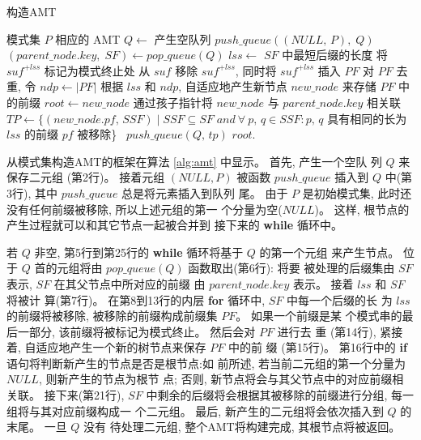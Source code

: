 \begin{algorithm}
  \caption{构造AMT}\scriptsize
  \label{alg:amt}
  \begin{algorithmic}[1]
    \REQUIRE 模式集 $P$
    \ENSURE  相应的 AMT
    \STATE
    \STATE $Q \leftarrow$ 产生空队列
    \STATE $push\_queue((NULL,\,P),\; Q)$
    \STATE
    \STATE $(parent\_node.key,\; SF) \leftarrow pop\_queue(Q)$
    \STATE $lss \leftarrow$ $SF$ 中最短后缀的长度
    \STATE 将 $suf^{+lss}$ 标记为模式终止处
    \ENDIF
    \STATE   从 $suf$ 移除 $suf^{+lss}$, 同时将 $suf^{+lss}$ 插入 $PF$
    \ENDFOR
    \STATE 对 $PF$ 去重, 令 $ndp \leftarrow |PF|$
    \STATE 根据 $lss$ 和 $ndp$, 自适应地产生新节点
    $new\_node$ 来存储 $PF$ 中的前缀
    \STATE $root \leftarrow new\_node$
    \ELSE
    \STATE 通过孩子指针将 $new\_node$
    与 $parent\_node.key$ 相关联
    \ENDIF
    \STATE $TP \leftarrow \{(new\_node.pf,\, SSF) \mid SSF \subseteq SF\; and
    \ \forall \ p,\,q \in SSF: p,\,q$ 具有相同的长为 $lss$ 的前缀
    $pf$ 被移除\}\
    \STATE $push\_queue(Q,\,tp)$
    \ENDFOR
    \ENDWHILE
    \STATE
    \RETURN $root$.
  \end{algorithmic}
\end{algorithm}

从模式集构造AMT的框架在算法 \ref{alg:amt} 中显示。 首先, 产生一个空队
列 $Q$ 来保存二元组 (第2行)。 接着元组 $(NULL, P)$ 被函数 $push\_queue$
插入到 $Q$ 中(第3行), 其中 $push\_queue$ 总是将元素插入到队列
尾。 由于 $P$ 是初始模式集, 此时还没有任何前缀被移除, 所以上述元组的第一
个分量为空($NULL$)。 这样, 根节点的产生过程就可以和其它节点一起被合并到
接下来的 \textbf{while} 循环中。

若 $Q$ 非空, 第5行到第25行的 \textbf{while} 循环将基于 $Q$ 的第一个元组
来产生节点。 位于 $Q$ 首的元组将由 $pop\_queue(Q)$ 函数取出(第6行): 将要
被处理的后缀集由 $SF$ 表示, $SF$ 在其父节点中所对应的前缀
由 $parent\_node.key$ 表示。 接着 $lss$ 和 $SF$ 将被计
算(第7行)。 在第8到13行的内层 \textbf{for} 循环中, $SF$ 中每一个后缀的长
为 $lss$ 的前缀将被移除, 被移除的前缀构成前缀集 $PF$。 如果一个前缀是某
个模式串的最后一部分, 该前缀将被标记为模式终止。 然后会对 $PF$ 进行去
重 (第14行), 紧接着, 自适应地产生一个新的树节点来保存 $PF$ 中的前
缀 (第15行)。 第16行中的 \textbf{if} 语句将判断新产生的节点是否是根节点:如
前所述, 若当前二元组的第一个分量为 $NULL$, 则新产生的节点为根节
点; 否则, 新节点将会与其父节点中的对应前缀相关联。 接下来(第21行), $SF$
中剩余的后缀将会根据其被移除的前缀进行分组, 每一组将与其对应前缀构成一
个二元组。 最后, 新产生的二元组将会依次插入到 $Q$ 的末尾。 一旦 $Q$ 没有
待处理二元组, 整个AMT将构建完成, 其根节点将被返回。

